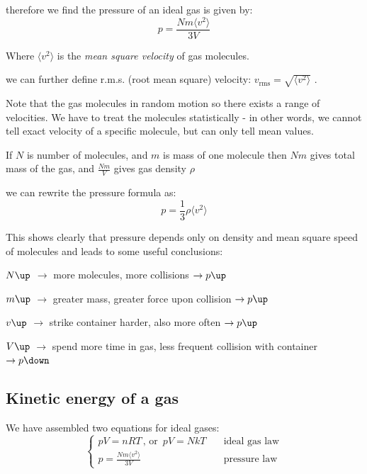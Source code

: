 \documentclass[a4paper,12pt]{book}
\newcommand{\cmt}{}
\newcommand{\avg}[1]{\langle#1\rangle}
\newcommand{\ra}{\rightarrow}
\newcommand{\tcbhighmath}[1]{\boxed{#1}}
\newcommand{\cmt}{}
\begin{document}
therefore we find the pressure of an ideal gas is given by: $$\tcbhighmath{p = \frac{Nm\avg{v^2}}{3V}}$$

\cmt Where $\avg{v^2}$ is the \emph{mean square velocity} of gas molecules.

we can further define r.m.s. (root mean square) velocity: $v_\text{rms} = \sqrt{\avg{v^2}}$ .

Note that the gas molecules in random motion so there exists a range of velocities. We have to treat the molecules statistically - in other words, we cannot tell exact velocity of a specific molecule, but can only tell mean values.

\cmt If $N$ is number of molecules, and $m$ is mass of one molecule then $Nm$ gives total mass of the gas, and $\frac{Nm}{V}$ gives gas density $\rho$

we can rewrite the pressure formula as: $$\tcbhighmath{p=\frac{1}{3}\rho \avg{v^2}}$$ 

This shows clearly that pressure depends only on density and mean square speed of molecules and leads to some useful conclusions:
\begin{compactitem}
\item[--] $N \up$ $\ra$ more molecules, more collisions $\ra p\up$

\item[--] $m \up$ $\ra$ greater mass, greater force upon collision $\ra p\up$

\item[--] $v \up$ $\ra$ strike container harder, also more often $\ra p\up$

\item[--] $V \up$ $\ra$ spend more time in gas, less frequent collision with container $\ra p\down$
\end{compactitem}

\subsection{Kinetic energy of a gas}

We have assembled two equations for ideal gases:
\begin{equation*}
\left\{
	\begin{array}{ll}
	pV = nRT \, \text{, or } \, pV = NkT &\quad \text{ideal gas law} \\
	p = \frac{Nm\avg{v^2}}{3V} &\quad \text{pressure law}
	\end{array} \right.
\end{equation*}
\end{document}

